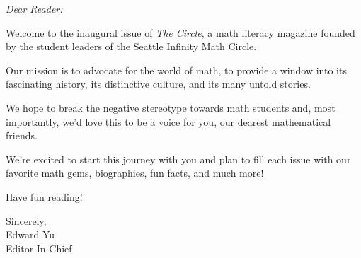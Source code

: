 \documentclass{article}
\date{\hspace{30mm}}
\begin{document}
\maketitle
\begin{minipage}[t]{.45\textwidth}\thispagestyle{empty}
  \vspace{-11mm}
  \tableofcontents
\end{minipage}%
\begin{minipage}[t]{.1\textwidth}\thispagestyle{empty}
  \;
\end{minipage}%
\begin{minipage}[t]{.45\textwidth}\thispagestyle{empty}
  \setlength{\parskip}{5pt}
  \vspace{-7mm}
  {\itshape
  Dear Reader:

  Welcome to the inaugural issue of \emph{The Circle}, a math literacy magazine founded by the student leaders of the Seattle Infinity Math Circle.

  Our mission is to advocate for the world of math, to provide a window into its fascinating history, its distinctive culture, and its many untold stories.

  We hope to break the negative stereotype towards math students and, most importantly, we'd love this to be a voice for you, our dearest mathematical friends.

  We're excited to start this journey with you and plan to fill each issue with our favorite math gems, biographies, fun facts, and much more!
  
  Have fun reading!

  Sincerely,\\
  Edward Yu\\
  Editor-In-Chief
  }
\end{minipage}

\vspace{3mm}

\closearticle
\end{document}

